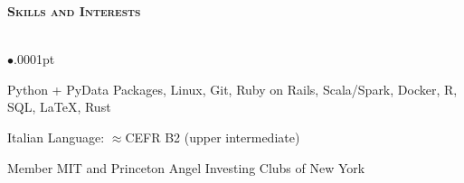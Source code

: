 \documentclass[11pt]{article}
\newcommand{\lineunder}{\vspace*{-8pt} \\ \hspace*{-18pt} \hrulefill \\}
\newcommand{\header}[1]{{\hspace*{-15pt}\vspace*{5pt} \Large \textsc{\textbf{#1}}} \vspace*{-6pt} \lineunder \vspace*{0pt} }
\newcommand{\employer}[4]{
	{\hspace*{-20pt} {\small{\textbf{\textsc{ #1}}}}
  \hfill \small{\emph{#2}}\\ ~\hspace*{-20pt} \small \emph{ #3 \hfill #4}}\\ }
\newenvironment{achievements}{\begin{list}{$\bullet$}{\topsep .0001pt \itemsep -2pt}}{\vspace*{5pt}\end{list} }
\begin{document}




\header{Skills and Interests}
	\vspace{-2pt}
	\begin{achievements}
		\item Python + PyData Packages, Linux, Git, Ruby on Rails, Scala/Spark, Docker, R, SQL, \LaTeX{}, Rust
		\item Italian Language: $\approx$CEFR B2 (upper intermediate)
		\item Member MIT and Princeton Angel Investing Clubs of New York
	\end{achievements}
\end{document}
